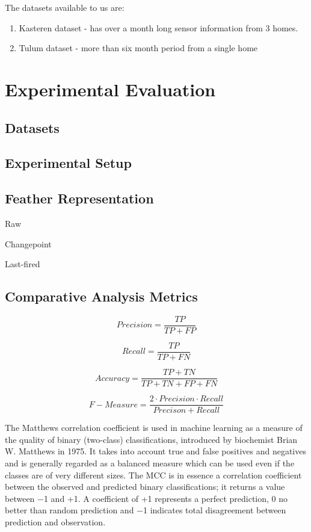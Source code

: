 \documentclass[11pt, oneside]{article}   	%
\begin{document}
The datasets available to us are:
	\begin{enumerate}
\item Kasteren dataset - has over a month long sensor information from 3 homes.
\item Tulum dataset - more than six month period from a single home
	\end{enumerate}


\section{Experimental Evaluation}

\subsection{Datasets}

\subsection{Experimental Setup}

\subsection{Feather Representation}

 Raw

Changepoint

Last-fired


\subsection{Comparative Analysis Metrics}

\begin{equation}
Precision = \frac{TP}{TP+FP}
\end{equation}

\begin{equation}
Recall = \frac{TP}{TP+FN}
\end{equation}

\begin{equation}
Accuracy = \frac{TP+TN}{TP+TN+FP+FN}
\end{equation}

\begin{equation}
F-Measure = \frac{2\cdot Precision\cdot Recall}{Precison+Recall}
\end{equation}

The Matthews correlation coefficient is used in machine learning as a measure of the quality of binary (two-class) classifications, introduced by biochemist Brian W. Matthews in 1975. It takes into account true and false positives and negatives and is generally regarded as a balanced measure which can be used even if the classes are of very different sizes. The MCC is in essence a correlation coefficient between the observed and predicted binary classifications; it returns a value between −1 and +1. A coefficient of +1 represents a perfect prediction, 0 no better than random prediction and −1 indicates total disagreement between prediction and observation.
\end{document}

